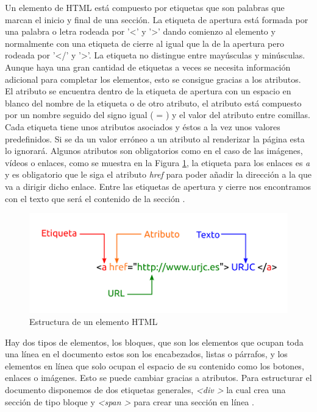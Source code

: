Un elemento de HTML está compuesto por etiquetas que son palabras que marcan el inicio y final de una sección. La etiqueta de apertura está formada por una palabra o letra rodeada por '\textless' y '\textgreater' dando comienzo al elemento y normalmente con una etiqueta de cierre al igual que la de la apertura pero rodeada por '\textless/' y '\textgreater'. La etiqueta no distingue entre mayúsculas y minúsculas. Aunque haya una gran cantidad de etiquetas a veces se necesita información adicional para completar los elementos, esto se consigue gracias a los atributos.\\ 

El atributo se encuentra dentro de la etiqueta de apertura con un espacio en blanco del nombre de la etiqueta o de otro atributo, el atributo está compuesto por un nombre seguido del signo igual ( = ) y el valor del atributo entre comillas. \\

Cada etiqueta tiene unos atributos asociados y éstos a la vez unos valores predefinidos. Si se da un valor erróneo a un atributo al renderizar la página esta lo ignorará. Algunos atributos son obligatorios como en el caso de las imágenes, vídeos o enlaces, como se muestra en la Figura \ref{fig:elemento}, la etiqueta para los enlaces es \textit{a} y es obligatorio que le siga el atributo \textit{href}  para poder añadir la dirección a la que va a dirigir dicho enlace. Entre las etiquetas de apertura y cierre nos encontramos con el texto que será el contenido de la sección \cite{etiqueta}.

\begin{figure}[H]
    \centering
    \includegraphics[width=12cm, keepaspectratio]{img/elemento.png}
    \caption{Estructura de un elemento HTML}
    \label{fig:elemento}
\end{figure}

Hay dos tipos de elementos, los bloques, que son los elementos que ocupan toda una línea en el documento estos son los encabezados, listas o párrafos, y los elementos en línea que solo ocupan el espacio de su contenido como los botones, enlaces o imágenes. Esto se puede cambiar gracias a atributos. Para estructurar el documento disponemos de dos etiquetas generales, \textit{\textless div \textgreater} la cual crea una sección de tipo bloque y \textit{\textless span \textgreater} para crear una sección en línea \cite{juan2}.\\

